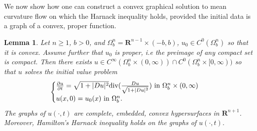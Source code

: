 \documentclass[pdflatex,sn-mathphys-num]{sn-jnl}%
\newtheorem{lemma}[theorem]{Lemma}
\begin{document}
We now show how one can construct a convex graphical solution to mean curvature flow on which the Harnack inequality holds, provided the initial data is a graph of a convex, proper function.  
\begin{lemma}\label{existence of convex evolution when deltawing}
Let $n\geq 1$, $b > 0$, and $\Omega^n_b = \mathbf{R}^{n-1}\times(-b,b)$, $u_0 \in C^0(\Omega^n_b)$ so that it is convex. Assume further that $u_0$ is proper, i.e the preimage of any compact set is compact. Then there exists $u \in C^{\infty}(\Omega^n_b \times (0, \infty)) \cap C^0(\Omega^n_b\times [0, \infty))$ so that $u$ solves the initial value problem
\begin{equation}
\begin{cases}
    \frac{\partial u}{\partial t} = \sqrt{1 + |Du|^2}\textit{\emph{div}}(\frac{Du}{\sqrt{1 + |Du|^2}}) \text{ in }\Omega^n_b \times (0, \infty) \\
    u(x,0) = u_0(x) \text{ in }\Omega^n_b.
\end{cases}
\end{equation}
The graphs of $u(\cdot, t)$ are complete, embedded, convex hypersurfaces in $\mathbf{R}^{n+1}$. Moreover, Hamilton's Harnack inequality holds on the graphs of $u(\cdot, t)$.
\end{lemma}
\end{document}
